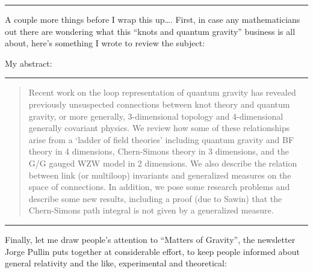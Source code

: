 \documentclass{article}
\def\tightlist{}
\renewcommand{\texttt}[1]{%
  \begingroup
  \ttfamily
  \begingroup\lccode`~=`/\lowercase{\endgroup\def~}{/\discretionary{}{}{}}%
  \begingroup\lccode`~=`[\lowercase{\endgroup\def~}{[\discretionary{}{}{}}%
  \begingroup\lccode`~=`.\lowercase{\endgroup\def~}{.\discretionary{}{}{}}%
  \catcode`/=\active\catcode`[=\active\catcode`.=\active
  \scantokens{#1\noexpand}%
  \endgroup
}
\begin{document}
\begin{center}\rule{0.5\linewidth}{0.5pt}\end{center}

A couple more things before I wrap this up\ldots. First, in case any
mathematicians out there are wondering what this ``knots and quantum
gravity'' business is all about, here's something I wrote to review the
subject:


My abstract:

\begin{center}\rule{0.5\linewidth}{0.5pt}\end{center}

\begin{quote}
Recent work on the loop representation of quantum gravity has revealed
previously unsuspected connections between knot theory and quantum
gravity, or more generally, 3-dimensional topology and 4-dimensional
generally covariant physics. We review how some of these relationships
arise from a `ladder of field theories' including quantum gravity and BF
theory in 4 dimensions, Chern-Simons theory in 3 dimensions, and the G/G
gauged WZW model in 2 dimensions. We also describe the relation between
link (or multiloop) invariants and generalized measures on the space of
connections. In addition, we pose some research problems and describe
some new results, including a proof (due to Sawin) that the Chern-Simons
path integral is not given by a generalized measure.
\end{quote}

\begin{center}\rule{0.5\linewidth}{0.5pt}\end{center}

Finally, let me draw people's attention to ``Matters of Gravity'', the
newsletter Jorge Pullin puts together at considerable effort, to keep
people informed about general relativity and the like, experimental and
theoretical:

\end{document}
